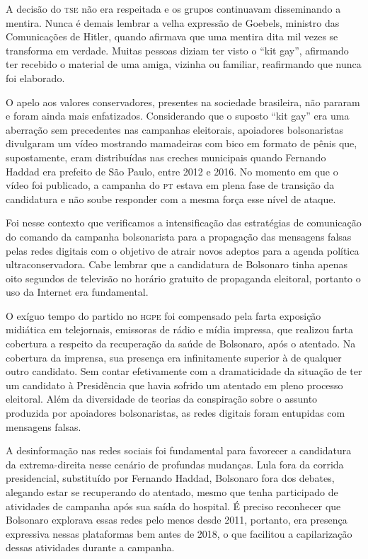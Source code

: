 A decisão do \textsc{tse} não era respeitada e os grupos continuavam disseminando
a mentira. Nunca é demais lembrar a velha expressão de Goebels, ministro
das Comunicações de Hitler, quando afirmava que uma mentira dita mil
vezes se transforma em verdade. Muitas pessoas diziam ter visto o ``kit
gay'', afirmando ter recebido o material de uma amiga, vizinha ou
familiar, reafirmando que nunca foi elaborado.

O apelo aos valores conservadores, presentes na sociedade brasileira,
não pararam e foram ainda mais enfatizados. Considerando que o suposto
``kit gay'' era uma aberração sem precedentes nas campanhas eleitorais,
apoiadores bolsonaristas divulgaram um vídeo mostrando mamadeiras com
bico em formato de pênis que, supostamente, eram distribuídas nas
creches municipais quando Fernando Haddad era prefeito de São Paulo,
entre 2012 e 2016. No momento em que o vídeo foi publicado, a campanha
do \textsc{pt} estava em plena fase de transição da
candidatura e não soube responder com a mesma força esse nível de
ataque.

Foi nesse contexto que verificamos a intensificação das estratégias de
comunicação do comando da campanha bolsonarista para a propagação das
mensagens falsas pelas redes digitais com o objetivo de atrair novos
adeptos para a agenda política ultraconservadora. Cabe lembrar que a
candidatura de Bolsonaro tinha apenas oito segundos de televisão no
horário gratuito de propaganda eleitoral, portanto o uso da Internet era
fundamental.

O exíguo tempo do partido no \textsc{hgpe} foi compensado pela farta exposição
midiática em telejornais, emissoras de rádio e mídia impressa, que
realizou farta cobertura a respeito da recuperação da saúde de
Bolsonaro, após o atentado. Na cobertura da imprensa, sua presença era 
infinitamente superior à de qualquer outro candidato. Sem contar efetivamente 
com a dramaticidade da situação de ter um candidato à Presidência que havia 
sofrido um atentado em pleno processo eleitoral. Além da diversidade de teorias 
da conspiração sobre o assunto produzida por apoiadores bolsonaristas, as redes digitais
foram entupidas com mensagens falsas.

A desinformação nas redes sociais foi fundamental para favorecer a
candidatura da extrema-direita nesse cenário de profundas mudanças. Lula
fora da corrida presidencial, substituído por Fernando Haddad, Bolsonaro
fora dos debates, alegando estar se recuperando do atentado, mesmo que
tenha participado de atividades de campanha após sua saída do hospital.
É preciso reconhecer que Bolsonaro explorava essas redes pelo menos
desde 2011, portanto, era presença expressiva nessas plataformas bem
antes de 2018, o que facilitou a capilarização dessas atividades durante
a campanha.

